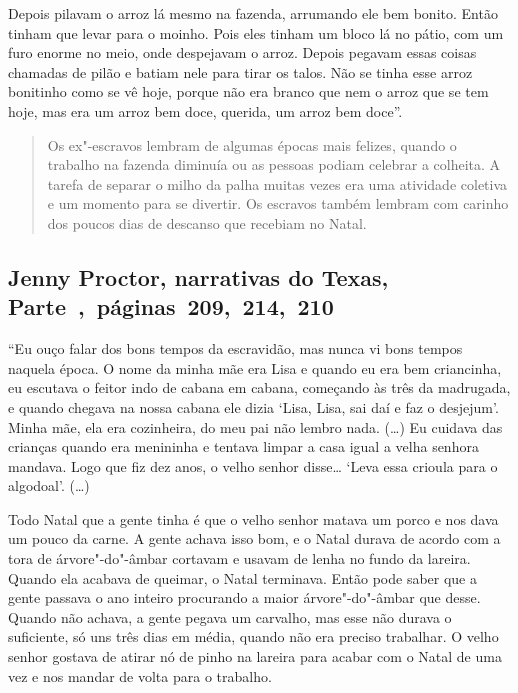 Depois pilavam o arroz lá mesmo na fazenda, arrumando ele bem bonito.
Então tinham que levar para o moinho. Pois eles tinham um bloco lá no
pátio, com um furo enorme no meio, onde despejavam o arroz. Depois
pegavam essas coisas chamadas de pilão e batiam nele para tirar os
talos. Não se tinha esse arroz bonitinho como se vê hoje, porque não era
branco que nem o arroz que se tem hoje, mas era um arroz bem doce,
querida, um arroz bem doce''.

\begin{quote}
Os ex"-escravos lembram de algumas épocas mais felizes, quando o
trabalho na fazenda diminuía ou as pessoas podiam celebrar a colheita. A
tarefa de separar o milho da palha muitas vezes era uma atividade
coletiva e um momento para se divertir. Os escravos também lembram com
carinho dos poucos dias de descanso que recebiam no Natal.
\end{quote}

\subsection{Jenny Proctor, narrativas do Texas, Parte~,~páginas~209,~214,~210}
\label{ref216}

``Eu ouço falar dos bons tempos da escravidão, mas nunca vi bons tempos
naquela época. O nome da minha mãe era Lisa e quando eu era bem
criancinha, eu escutava o feitor indo de cabana em cabana, começando às
três da madrugada, e quando chegava na nossa cabana ele dizia `Lisa,
Lisa, sai daí e faz o desjejum'. Minha mãe, ela era cozinheira, do meu
pai não lembro nada. (\ldots{}) Eu cuidava das crianças quando era
menininha e tentava limpar a casa igual a velha senhora mandava. Logo
que fiz dez anos, o velho senhor disse\ldots{} `Leva essa crioula para o %
algodoal'. (\ldots{})

Todo Natal que a gente tinha é que o velho senhor matava um porco e 
nos dava um pouco da carne. A gente achava isso bom, e o Natal durava de
acordo com a tora de árvore"-do"-âmbar cortavam e usavam de lenha no fundo %
da lareira. Quando ela acabava de queimar, o Natal terminava. Então pode
saber que a gente passava o ano inteiro procurando a maior
árvore"-do"-âmbar que desse. Quando não achava, a gente pegava um
carvalho, mas esse não durava o suficiente, só uns três dias em média,
quando não era preciso trabalhar. O velho senhor gostava de atirar nó de
pinho na lareira para acabar com o Natal de uma vez e nos mandar de
volta para o trabalho.

